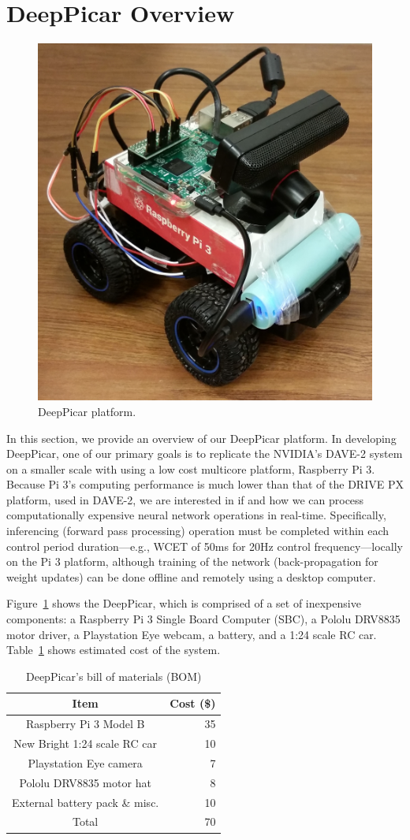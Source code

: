 \section{DeepPicar Overview}

\begin{figure}[h]
  \centering
  \includegraphics[width=.4\textwidth]{figs/DeepPicar_platform}
  \caption{DeepPicar platform.}
  \label{fig:overview}
\end{figure}

In this section, we provide an overview of our DeepPicar platform. In
developing DeepPicar, one of our primary goals is to replicate the
NVIDIA's DAVE-2 system on a smaller scale with using a low cost
multicore platform, Raspberry Pi 3. Because Pi 3's computing
performance is much lower than that of the DRIVE PX platform, used in
DAVE-2, we are interested in if and how we can process
computationally expensive neural network operations in
real-time. Specifically, inferencing (forward pass processing)
operation must be completed within each control period
duration---e.g., WCET of 50ms for 20Hz control frequency---locally on
the Pi 3 platform, although training of the network (back-propagation
for weight updates) can be done offline and remotely using a desktop
computer.

Figure~\ref{fig:overview} shows the DeepPicar, which is comprised of a
set of inexpensive components: a Raspberry Pi 3 Single Board Computer
(SBC), a Pololu DRV8835 motor driver, a Playstation Eye webcam, a
battery, and a 1:24 scale RC car. Table~\ref{tbl:carbom} shows
estimated cost of the system.

\begin{table}[h]
  \centering
  \begin{tabular}{|c|r|}
    \hline
    Item                    & Cost (\$) \\
    \hline
    Raspberry Pi 3 Model B  & 35 \\
    New Bright 1:24 scale RC car       & 10 \\
    Playstation Eye camera  &  7 \\
    Pololu DRV8835 motor hat&  8 \\
    External battery pack \& misc.   & 10 \\
    \hline
    Total                   & 70 \\
    \hline
  \end{tabular}
  \caption{DeepPicar's bill of materials (BOM)}
  \label{tbl:carbom}
\end{table}

